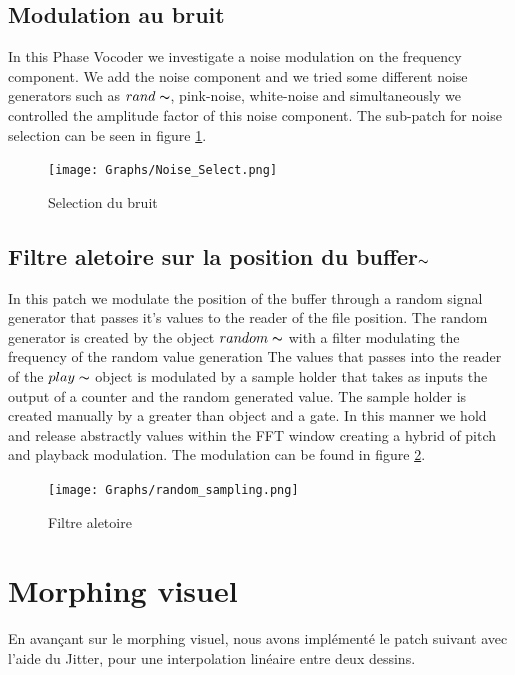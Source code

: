 \subsection{Modulation au bruit}
    In this Phase Vocoder we investigate a noise modulation on the frequency component. We add the noise component and we tried some different noise generators such as $rand\thicksim$, pink-noise, white-noise and simultaneously we controlled the amplitude factor of this noise component. The sub-patch for noise selection can be seen in figure \ref{Noise_Select}.

    \begin{figure}
        \centering
        \texttt{[image: Graphs/Noise\_Select.png]}
        \caption{Selection du bruit}
        \label{Noise_Select}
    \end{figure}

\subsection{Filtre aletoire sur la position du buffer$\thicksim$}

    In this patch we modulate the position of the buffer through a random signal generator that passes it's values to the reader of the file position. The random generator is created by the object $random\thicksim$ with a filter modulating the frequency of the random value generation The values that passes into the reader of the $play\thicksim$ object is modulated by a sample holder that takes as inputs the output of a counter and the random generated value. The sample holder is created manually by a greater than object and a gate. In this manner we hold and release abstractly values within the FFT window creating a hybrid of pitch and playback modulation. The modulation can be found in figure \ref{random_sampling}.

    \begin{figure}
        \centering
        \texttt{[image: Graphs/random\_sampling.png]}
        \caption{Filtre aletoire}
        \label{random_sampling}
    \end{figure}
    

\section{Morphing visuel}

En avançant sur le morphing visuel, nous avons implémenté le patch suivant avec l’aide du Jitter, pour une interpolation linéaire entre deux dessins.

